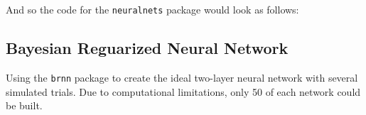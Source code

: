 \documentclass[
]{article}
\newenvironment{Shaded}{\begin{snugshade}}{\end{snugshade}}
\newcommand{\AttributeTok}[1]{\textcolor[rgb]{0.77,0.63,0.00}{#1}}
\newcommand{\ControlFlowTok}[1]{\textcolor[rgb]{0.13,0.29,0.53}{\textbf{#1}}}
\newcommand{\DecValTok}[1]{\textcolor[rgb]{0.00,0.00,0.81}{#1}}
\newcommand{\FloatTok}[1]{\textcolor[rgb]{0.00,0.00,0.81}{#1}}
\newcommand{\FunctionTok}[1]{\textcolor[rgb]{0.00,0.00,0.00}{#1}}
\newcommand{\NormalTok}[1]{#1}
\newcommand{\OtherTok}[1]{\textcolor[rgb]{0.56,0.35,0.01}{#1}}
\newcommand{\SpecialCharTok}[1]{\textcolor[rgb]{0.00,0.00,0.00}{#1}}
\newcommand{\StringTok}[1]{\textcolor[rgb]{0.31,0.60,0.02}{#1}}
\begin{document}
And so the code for the \texttt{neuralnets} package would look as
follows:

\begin{Shaded}
\end{Shaded}

\hypertarget{bayesian-reguarized-neural-network}{%
\subsection{Bayesian Reguarized Neural
Network}\label{bayesian-reguarized-neural-network}}

Using the \texttt{brnn} package \cite{brnn} to create the ideal
two-layer neural network with several simulated trials. Due to
computational limitations, only 50 of each network could be built.
\end{document}
